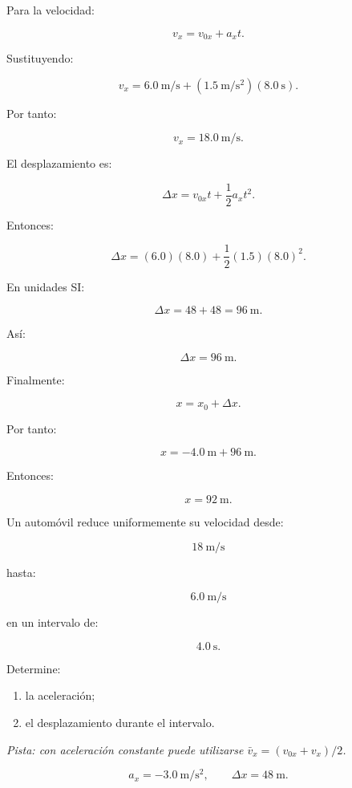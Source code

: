 \begin{explicacion}
Para la velocidad:

\[ v_x=v_{0x}+a_xt. \]

Sustituyendo:

\[
v_x
=
\SI{6.0}{\meter\per\second}
+
(\SI{1.5}{\meter\per\second\squared})
(\SI{8.0}{\second}).
\]

Por tanto:

\[ \boxed{v_x=\SI{18.0}{\meter\per\second}}. \]

El desplazamiento es:

\[ \Delta x=v_{0x}t+\frac{1}{2}a_xt^2. \]

Entonces:

\[
\Delta x
=
(6.0)(8.0)
+
\frac{1}{2}(1.5)(8.0)^2.
\]

En unidades SI:

\[
\Delta x
=
48+48
=
\SI{96}{\meter}.
\]

Así:

\[ \boxed{\Delta x=\SI{96}{\meter}}. \]

Finalmente:

\[ x=x_0+\Delta x. \]

Por tanto:

\[
x
=
-\SI{4.0}{\meter}
+
\SI{96}{\meter}.
\]

Entonces:

\[ \boxed{x=\SI{92}{\meter}}. \]
\end{explicacion}


\begin{ejercicio}
Un automóvil reduce uniformemente su velocidad desde:

\[ \SI{18}{\meter\per\second} \]

hasta:

\[ \SI{6.0}{\meter\per\second} \]

en un intervalo de:

\[ \SI{4.0}{\second}. \]

Determine:

\begin{enumerate}[label=\alph*)]
    \item la aceleración;
    \item el desplazamiento durante el intervalo.
\end{enumerate}

\textit{Pista: con aceleración constante puede utilizarse \(\bar{v}_x=(v_{0x}+v_x)/2\).}
\end{ejercicio}

\begin{respuesta}
\[
\boxed{a_x=-\SI{3.0}{\meter\per\second\squared}},
\qquad
\boxed{\Delta x=\SI{48}{\meter}}.
\]
\end{respuesta}

